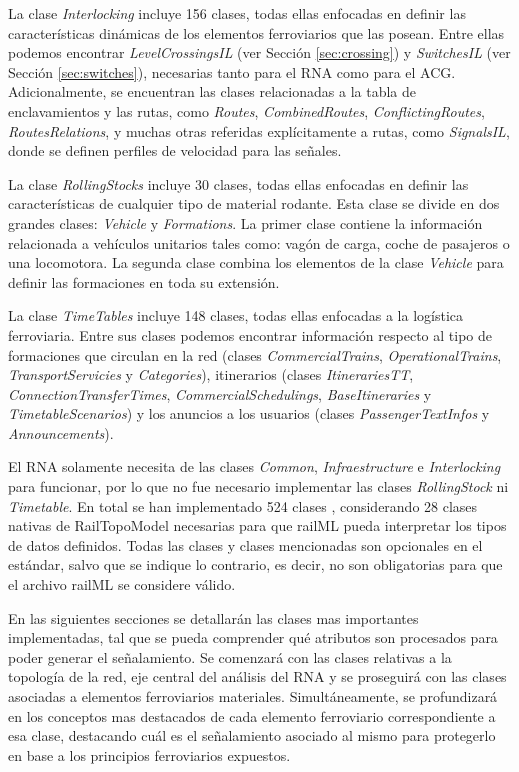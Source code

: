     La clase \textit{Interlocking} incluye 156 clases, todas ellas enfocadas en definir las características dinámicas de los elementos ferroviarios que las posean. Entre ellas podemos encontrar \textit{LevelCrossingsIL} (ver Sección \ref{sec:crossing}) y \textit{SwitchesIL} (ver Sección \ref{sec:switches}), necesarias tanto para el RNA como para el ACG. Adicionalmente, se encuentran las clases relacionadas a la tabla de enclavamientos y las rutas, como \textit{Routes}, \textit{CombinedRoutes}, \textit{ConflictingRoutes}, \textit{RoutesRelations},  y muchas otras referidas explícitamente a rutas, como \textit{SignalsIL}, donde se definen perfiles de velocidad para las señales. 
    
    La clase \textit{RollingStocks} incluye 30 clases, todas ellas enfocadas en definir las características de cualquier tipo de material rodante. Esta clase se divide en dos grandes clases: \textit{Vehicle} y \textit{Formations}. La primer clase contiene la información relacionada a vehículos unitarios tales como: vagón de carga, coche de pasajeros o una locomotora. La segunda clase combina los elementos de la clase \textit{Vehicle} para definir las formaciones en toda su extensión.
    
    La clase \textit{TimeTables} incluye 148 clases, todas ellas enfocadas a la logística ferroviaria. Entre sus clases podemos encontrar información respecto al tipo de formaciones que circulan en la red (clases \textit{CommercialTrains}, \textit{OperationalTrains}, \textit{TransportServicies} y \textit{Categories}), itinerarios (clases \textit{ItinerariesTT}, \textit{ConnectionTransferTimes}, \textit{CommercialSchedulings}, \textit{BaseItineraries} y \textit{TimetableScenarios}) y los anuncios a los usuarios (clases \textit{PassengerTextInfos} y \textit{Announcements}).   
    
    El RNA solamente necesita de las clases \textit{Common}, \textit{Infraestructure} e \textit{Interlocking} para funcionar, por lo que no fue necesario implementar las clases \textit{RollingStock} ni \textit{Timetable}. En total se han implementado 524 clases \cite{GITHUB}, considerando 28 clases nativas de RailTopoModel necesarias para que railML pueda interpretar los tipos de datos definidos. Todas las clases y clases mencionadas son opcionales en el estándar, salvo que se indique lo contrario, es decir, no son obligatorias para que el archivo railML se considere válido.

    En las siguientes secciones se detallarán las clases mas importantes implementadas, tal que se pueda comprender qué atributos son procesados para poder generar el señalamiento. Se comenzará con las clases relativas a la topología de la red, eje central del análisis del RNA y se proseguirá con las clases asociadas a elementos ferroviarios materiales. Simultáneamente, se profundizará en los conceptos mas destacados de cada elemento ferroviario correspondiente a esa clase, destacando cuál es el señalamiento asociado al mismo para protegerlo en base a los principios ferroviarios expuestos.

